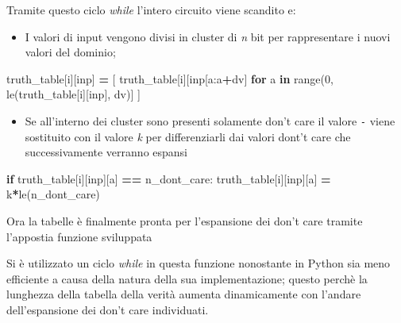 \documentclass[
]{book}
\newenvironment{Shaded}{\begin{snugshade}}{\end{snugshade}}
\newcommand{\BuiltInTok}[1]{#1}
\newcommand{\ControlFlowTok}[1]{\textcolor[rgb]{0.13,0.29,0.53}{\textbf{#1}}}
\newcommand{\DecValTok}[1]{\textcolor[rgb]{0.00,0.00,0.81}{#1}}
\newcommand{\KeywordTok}[1]{\textcolor[rgb]{0.13,0.29,0.53}{\textbf{#1}}}
\newcommand{\NormalTok}[1]{#1}
\newcommand{\OperatorTok}[1]{\textcolor[rgb]{0.81,0.36,0.00}{\textbf{#1}}}
\newcommand{\StringTok}[1]{\textcolor[rgb]{0.31,0.60,0.02}{#1}}
\providecommand{\tightlist}{%
  \setlength{\itemsep}{0pt}\setlength{\parskip}{0pt}}
\begin{document}
\newpage

Tramite questo ciclo \emph{while} l'intero circuito viene scandito e:

\begin{itemize}
\tightlist
\item
  I valori di input vengono divisi in cluster di \emph{n} bit per rappresentare i nuovi valori del dominio;
\end{itemize}

\begin{Shaded}
\begin{Highlighting}[]
\NormalTok{truth\_table[i][}\StringTok{\textquotesingle{}inp\textquotesingle{}}\NormalTok{] }\OperatorTok{=}\NormalTok{ [}
\NormalTok{   truth\_table[i][}\StringTok{\textquotesingle{}inp\textquotesingle{}}\NormalTok{[a:a}\OperatorTok{+}\NormalTok{dv]}
   \ControlFlowTok{for}\NormalTok{ a }\KeywordTok{in} \BuiltInTok{range}\NormalTok{(}\DecValTok{0}\NormalTok{, le(truth\_table[i][}\StringTok{\textquotesingle{}inp\textquotesingle{}}\NormalTok{], dv)]}
\NormalTok{ ]}
\end{Highlighting}
\end{Shaded}

\begin{itemize}
\tightlist
\item
  Se all'interno dei cluster sono presenti solamente don't care il valore \texttt{-} viene sostituito con il valore \emph{k} per differenziarli dai valori dont't care che successivamente verranno espansi
\end{itemize}

\begin{Shaded}
\begin{Highlighting}[]
\ControlFlowTok{if}\NormalTok{ truth\_table[i][}\StringTok{\textquotesingle{}inp\textquotesingle{}}\NormalTok{][a] }\OperatorTok{==}\NormalTok{ n\_dont\_care:}
\NormalTok{  truth\_table[i][}\StringTok{\textquotesingle{}inp\textquotesingle{}}\NormalTok{][a] }\OperatorTok{=} \StringTok{\textquotesingle{}k\textquotesingle{}}\OperatorTok{*}\NormalTok{le(n\_dont\_care)}
\end{Highlighting}
\end{Shaded}

Ora la tabelle è finalmente pronta per l'espansione dei don't care tramite l'appostia funzione sviluppata

Si è utilizzato un ciclo \emph{while} in questa funzione nonostante in Python sia meno efficiente a causa della natura della sua implementazione; questo perchè la lunghezza della tabella della verità aumenta dinamicamente con l'andare dell'espansione dei don't care individuati.
\end{document}

